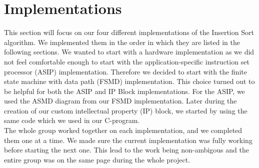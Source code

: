 \documentclass[conference]{IEEEtran}
\begin{document}
\section{Implementations}
This section will focus on our four different implementations of the Insertion Sort algorithm. We implemented them in the order in which they are listed in the following sections. We wanted to start with a hardware implementation as we did not feel comfortable enough to start with the application-specific instruction set processor (ASIP) implementation. Therefore we decided to start with the finite state machine with data path (FSMD) implementation. This choice turned out to be helpful for both the ASIP and IP Block implementations. For the ASIP, we used the ASMD diagram from our FSMD implementation. Later during the creation of our custom intellectual property (IP) block, we started by using the same code which we used in our C-program. \\
The whole group worked together on each implementation, and we completed them one at a time. We made sure the current implementation was fully working before starting the next one. This lead to the work being non-ambigous and the entire group was on the same page during the whole project.
\end{document}
